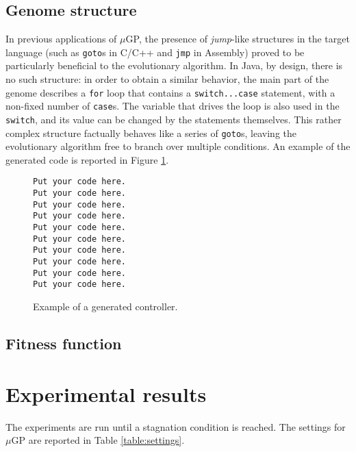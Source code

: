 \documentclass[]{article}
\begin{document}
\subsection{Genome structure}
In previous applications of $\mu$GP, the presence of \emph{jump}-like structures in the target language (such as \texttt{goto}s in C/C++ and \texttt{jmp} in Assembly) proved to be particularly beneficial to the evolutionary algorithm. In Java, by design, there is no such structure: in order to obtain a similar behavior, the main part of the genome describes a \texttt{for} loop that contains a \texttt{switch...case} statement, with a non-fixed number of \texttt{case}s. The variable that drives the loop is also used in the \texttt{switch}, and its value can be changed by the statements themselves. This rather complex structure factually behaves like a series of \texttt{goto}s, leaving the evolutionary algorithm free to branch over multiple conditions. An example of the generated code is reported in Figure \ref{fig:codeblock}.

\begin{figure}
\begin{lstlisting} 
Put your code here.
Put your code here. 
Put your code here. 
Put your code here. 
Put your code here. 
Put your code here. 
Put your code here. 
Put your code here. 
Put your code here. 
Put your code here.  
\end{lstlisting}
\caption{Example of a generated controller.}
\label{fig:codeblock}
\end{figure}

\subsection{Fitness function}

\section{Experimental results}
The experiments are run until a stagnation condition is reached. The settings for $\mu$GP are reported in Table \ref{table:settings}.
\end{document}

